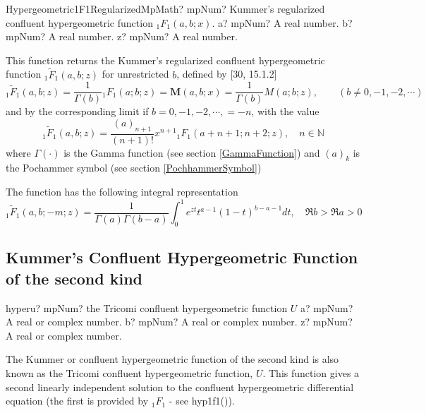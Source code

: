 \begin{mpFunctionsExtract}
	\mpFunctionThreeNotImplemented
	{Hypergeometric1F1RegularizedMpMath? mpNum? Kummer's regularized confluent hypergeometric function ${}_1F_1(a, b; x)$.}
	{a? mpNum? A real number.}
	{b? mpNum? A real number.}
	{z? mpNum? A real number.}
\end{mpFunctionsExtract}

\vspace{0.3cm}
This function returns the Kummer's regularized confluent hypergeometric function ${}_1\widetilde{F}_1(a,b;z)$ for unrestricted $b$, defined by [30, 15.1.2]
\begin{equation}
{}_1\widetilde{F}_1(a,b;z)  = \frac{1}{\Gamma(b)} {}_1F_1(a;b;z) = \boldsymbol{M}(a,b;x) = \frac{1}{\Gamma(b)} M(a;b;z), \quad \quad (b \neq	0, -1, -2, \cdots)
\end{equation}
and by the corresponding limit if $b = 0, -1, -2, \cdots, = -n$, with the value
\begin{equation}
{}_1\widetilde{F}_1(a,b;z)  = \frac{(a)_{n+1}}{(n+1)!} x^{n+1} {}_1F_1(a+n+1;n+2;z), \quad n \in \mathbb{N}
\end{equation}
where $\Gamma(\cdot)$ is the Gamma function (see section \ref{GammaFunction}) and $(a)_k$ is the Pochammer symbol (see section \ref{PochhammerSymbol})

The function has the following integral representation
\begin{equation}
{}_1\widetilde{F}_1(a,b;-m;z)  = \frac{1}{\Gamma(a)\Gamma(b-a)} \int_0^1{e^{zt}  t^{a-1}(1-t)^{b-a-1}}dt, \quad \Re b > \Re a > 0
\end{equation}





\subsection{Kummer's Confluent Hypergeometric Function of the second kind}

\begin{mpFunctionsExtract}
	\mpFunctionThree
	{hyperu? mpNum? the Tricomi confluent hypergeometric function $U$}
	{a? mpNum? A real or complex number.}
	{b? mpNum? A real or complex number.}
	{z? mpNum? A real or complex number.}		
\end{mpFunctionsExtract}

\vpara
The Kummer or confluent hypergeometric function of the second kind is also known as the Tricomi confluent hypergeometric function, $U$. This function gives a second linearly independent solution to the confluent hypergeometric differential equation (the first is provided by ${}_1F_1$ - see hyp1f1()).


